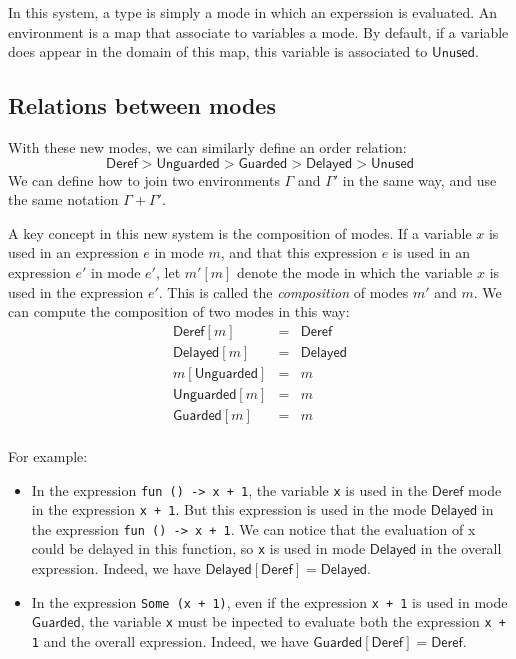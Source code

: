 \documentclass{article}
\newcommand{\Deref}{\mathsf{Deref}}
\newcommand{\Unguarded}{\mathsf{Unguarded}}
\newcommand{\Guarded}{\mathsf{Guarded}}
\newcommand{\Delayed}{\mathsf{Delayed}}
\newcommand{\Unused}{\mathsf{Unused}}
\begin{document}
In this system, a type is simply a mode in which an experssion is evaluated. An
environment is a map that associate to variables a mode. By default, if a
variable does appear in the domain of this map, this variable is associated to
$\Unused$.

\subsection{Relations between modes}
With these new modes, we can similarly define an order relation:
$$\Deref > \Unguarded > \Guarded > \Delayed > \Unused$$
We can define how to join two environments $\Gamma$ and $\Gamma'$ in the same
way, and use the same notation $\Gamma + \Gamma'$.

A key concept in this new system is the composition of modes. If a variable $x$
is used in an expression $e$ in mode $m$, and that this expression $e$ is used
in an expression $e'$ in mode $e'$, let $m'[m]$ denote the mode in which the
variable $x$ is used in the expression $e'$. This is called the
\textit{composition} of modes $m'$ and $m$.  We can compute the composition of two modes in this way: \begin{displaymath} \begin{array}{lll} \Deref [m]     & = & \Deref   \\
    \Delayed [m]   & = & \Delayed \\
    m[\Unguarded]  & = & m        \\
    \Unguarded [m] & = & m        \\
    \Guarded [m]   & = & m        \\
  \end{array}
\end{displaymath}

For example:
\begin{itemize}
  \item In the expression \lstinline|fun () -> x + 1|, the variable
    \lstinline|x| is used in the $\Deref$ mode in the expression
    \lstinline|x + 1|. But this expression is used in the mode $\Delayed$ in the
    expression \lstinline|fun () -> x + 1|. We can notice that the evaluation of
    x could be delayed in this function, so \lstinline|x| is used in mode
    $\Delayed$ in the overall expression. Indeed, we have
    $\Delayed [\Deref] = \Delayed$.

  \item In the expression \lstinline|Some (x + 1)|, even if the expression
    \lstinline|x + 1| is used in mode $\Guarded$, the variable \lstinline|x|
    must be inpected to evaluate both the expression \lstinline|x + 1| and the
    overall expression. Indeed, we have $\Guarded [\Deref] = \Deref$.
\end{itemize}
\end{document}
